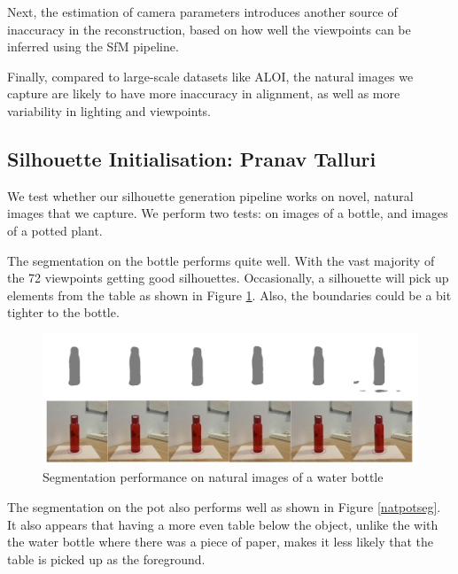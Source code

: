 \documentclass{article}
\begin{document}
Next, the estimation of camera parameters introduces another source of inaccuracy in the reconstruction, based on how well the viewpoints can be inferred using the SfM pipeline.

Finally, compared to large-scale datasets like ALOI, the natural images we capture are likely to have more inaccuracy in alignment, as well as more variability in lighting and viewpoints.

\newpage
\subsection{Silhouette Initialisation: Pranav Talluri}

We test whether our silhouette generation pipeline works on novel, natural images that we capture. We perform two tests: on images of a bottle, and images of a potted plant.

The segmentation on the bottle performs quite well. With the vast majority of the 72 viewpoints getting good silhouettes. Occasionally, a silhouette will pick up elements from the table as shown in Figure \ref{bottleseg}. Also, the boundaries could be a bit tighter to the bottle.

\begin{figure}[h!]
  \centering
  \includegraphics[width=\textwidth]{images/bottleseg.png}
  \caption{Segmentation performance on natural images of a water bottle}
  \label{bottleseg}
\end{figure}

The segmentation on the pot also performs well as shown in Figure \ref{natpotseg}. It also appears that having a more even table below the object, unlike the with the water bottle where there was a piece of paper, makes it less likely that the table is picked up as the foreground.
\end{document}

